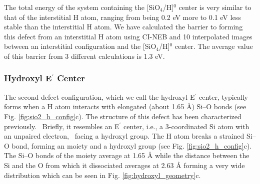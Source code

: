 \documentclass[aps,prb,reprint,superscriptaddress,showpacs]{revtex4-1}
\begin{document}
The total energy of the system containing the [SiO$_4$/H]$^0$ center is very similar to that of the interstitial H atom, ranging from being 0.2 eV more to 0.1 eV less stable than the interstitial H atom. We have calculated the barrier to forming this defect from an interstitial H atom using CI-NEB and 10 interpolated images between an interstitial configuration and the [SiO$_4$/H]$^0$ center. The average value of this barrier from 3 different calculations is 1.3 eV. 


\subsubsection{Hydroxyl E$^\prime$ Center}

The second defect configuration, which we call the hydroxyl E$^\prime$ center, typically forms when a H atom interacts with elongated (about 1.65 {\AA}) \mbox{Si--O} bonds (see Fig. \ref{fig:sio2_h_config}c). The structure of this defect has been characterized previously.~\cite{aelsayed_prl} Briefly, it resembles an E$^\prime$ center, i.e., a 3-coordinated Si atom with an unpaired electron,~\cite{rudra_eprime} facing a hydroxyl group. The H atom breaks a strained \mbox{Si--O} bond, forming an \hspace{2 pt} moiety and a hydroxyl group (see Fig. \ref{fig:sio2_h_config}c). The \mbox{Si--O} bonds of the \hspace{2 pt} moiety average at 1.65 {\AA} while the distance between the Si and the O from which it dissociated averages at 2.63 {\AA} forming a very wide distribution which can be seen in Fig. \ref{fig:hydroxyl_geometry}c. 
\end{document}
